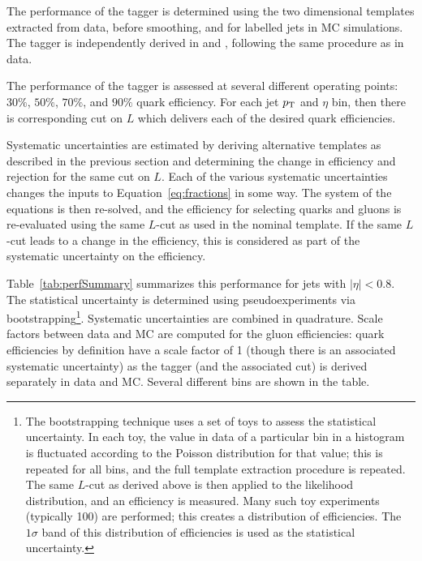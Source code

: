 The performance of the tagger is determined using the two dimensional templates extracted from data, before smoothing, and for labelled jets in MC simulations. The tagger is independently derived in \Pythia and \Herwigpp, following the same procedure as in data. 

The performance of the tagger is assessed at several different operating points: $30\%$, $50\%$, $70\%$, and $90\%$ quark efficiency. For each jet $p_{\text{T}}$ and $\eta$ bin, then there is corresponding cut on $L$ which delivers each of the desired quark efficiencies.

Systematic uncertainties are estimated by deriving alternative templates as described in the previous section and determining the change in efficiency and rejection for the same cut on $L$. Each of the various systematic uncertainties changes the inputs to Equation~\ref{eq:fractions} in some way. The system of the equations is then re-solved, and the efficiency for selecting quarks and gluons is re-evaluated using the same $L$-cut as used in the nominal template. If the same $L$-cut leads to a change in the efficiency, this is considered as part of the systematic uncertainty on the efficiency.

Table~\ref{tab:perfSummary} summarizes this performance for jets with $|\eta|<0.8$. The statistical uncertainty is determined using pseudoexperiments via bootstrapping\footnote{The bootstrapping technique uses a set of toys to assess the statistical uncertainty. In each toy, the value in data of a particular bin in a histogram is fluctuated according to the Poisson distribution for that value; this is repeated for all bins, and the full template extraction procedure is repeated. The same $L$-cut as derived above is then applied to the likelihood distribution, and an efficiency is measured. Many such toy experiments (typically 100) are performed; this creates a distribution of efficiencies. The $1\sigma$ band of this distribution of efficiencies is used as the statistical uncertainty.}. Systematic uncertainties are combined in quadrature. Scale factors between data and MC are computed for the gluon efficiencies: quark efficiencies by definition have a scale factor of 1 (though there is an associated systematic uncertainty) as the tagger (and the associated cut) is derived separately in data and MC. Several different \pt bins are shown in the table. 


